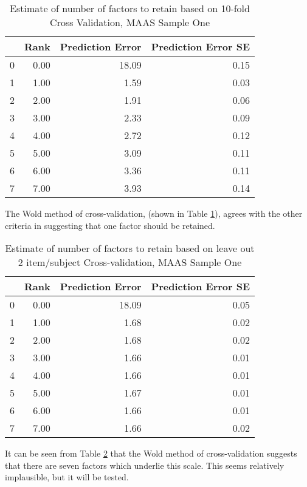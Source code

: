\documentclass{article}
\begin{document}
\begin{table}[ht]
\centering
\begin{tabular}{rrrr}
  \hline
 & Rank & Prediction Error & Prediction Error SE \\ 
  \hline
0 & 0.00 & 18.09 & 0.15 \\ 
  1 & 1.00 & 1.59 & 0.03 \\ 
  2 & 2.00 & 1.91 & 0.06 \\ 
  3 & 3.00 & 2.33 & 0.09 \\ 
  4 & 4.00 & 2.72 & 0.12 \\ 
  5 & 5.00 & 3.09 & 0.11 \\ 
  6 & 6.00 & 3.36 & 0.11 \\ 
  7 & 7.00 & 3.93 & 0.14 \\ 
   \hline
\end{tabular}
\caption{Estimate of number of factors to retain based on 10-fold Cross Validation, MAAS Sample One} 
\label{tab:maasfactwold}
\end{table}
The Wold method of cross-validation, (shown in Table \ref{tab:maasfactwold}), agrees with the other criteria in suggesting that one factor should be retained. 


\begin{table}[ht]
\centering
\begin{tabular}{rrrr}
  \hline
 & Rank & Prediction Error & Prediction Error SE \\ 
  \hline
0 & 0.00 & 18.09 & 0.05 \\ 
  1 & 1.00 & 1.68 & 0.02 \\ 
  2 & 2.00 & 1.68 & 0.02 \\ 
  3 & 3.00 & 1.66 & 0.01 \\ 
  4 & 4.00 & 1.66 & 0.01 \\ 
  5 & 5.00 & 1.67 & 0.01 \\ 
  6 & 6.00 & 1.66 & 0.01 \\ 
  7 & 7.00 & 1.66 & 0.02 \\ 
   \hline
\end{tabular}
\caption{Estimate of number of factors to retain based on leave out 2 item/subject Cross-validation, MAAS Sample One} 
\label{tab:maasfactgabriel}
\end{table}
It can be seen from Table \ref{tab:maasfactgabriel} that the Wold method of cross-validation suggests that there are seven factors which underlie this scale. This seems relatively implausible, but it will be tested. 
\end{document}
